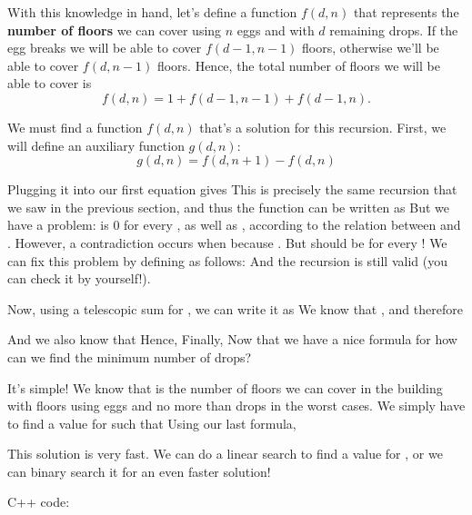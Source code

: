 With this knowledge in hand, let's define a function $f(d,n)$ that
represents the \textbf{number of floors} we can cover using $n$ eggs and
with $d$ remaining drops.  If the egg breaks we will be able to cover
$f(d-1,n-1)$ floors, otherwise we'll be able to cover $f(d,n-1)$ floors.
Hence, the total number of floors we will be able to cover is
\begin{equation*}
f(d,n)=1+f(d-1,n-1)+f(d-1,n).
\end{equation*}

We must find a function $f(d,n)$ that's a solution for this recursion.
First, we will define an auxiliary function $g(d,n)$:
\begin{equation*}
g(d,n) = f(d,n+1)-f(d,n)
\end{equation*}

Plugging it into our first equation gives
This is precisely the same recursion that we saw in the previous section, and thus the function  can be written as
But we have a problem:  is 0 for every
, as well as , according to the relation between  and . However, a contradiction occurs when  because . But  should be  for every ! We can fix this problem by defining  as follows:
And the recursion is still valid (you can check it by yourself!).

Now, using a telescopic sum for , we can write it as
We know that , and therefore

And we also know that
Hence,
Finally,
Now that we have a nice formula for  how can we find the minimum number of drops?

It's simple! We know that  is the number of floors we can cover in the building with  floors using  eggs and no more than  drops in the worst cases. We simply have to find a value for  such that
Using our last formula,

This solution is very fast. We can do a linear search to find a value for , or we can binary search it for an even faster solution!

C++ code:

